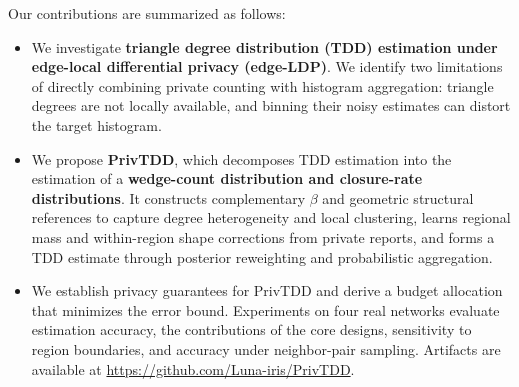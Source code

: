 Our contributions are summarized as follows:
\begin{itemize}

\item We investigate \textbf{triangle degree distribution (TDD) estimation under edge-local differential privacy (edge-LDP)}. %
We identify two limitations of directly combining private counting with histogram aggregation: triangle degrees are not locally available, and binning their noisy estimates can distort the target histogram.


\item We propose \textbf{PrivTDD}, which decomposes TDD estimation into the estimation of a \textbf{wedge-count distribution and closure-rate distributions}.
It constructs complementary $\beta$ and geometric structural references to capture degree heterogeneity and local clustering, learns regional mass and within-region shape corrections from private reports, and forms a TDD estimate through posterior reweighting and probabilistic aggregation.

\item We establish privacy  guarantees for PrivTDD and derive a budget allocation that minimizes the error bound.
Experiments on four real networks evaluate estimation accuracy, the contributions of the core designs, sensitivity to region boundaries, and accuracy under neighbor-pair sampling.
Artifacts are available at \url{https://github.com/Luna-iris/PrivTDD}.
\end{itemize}

